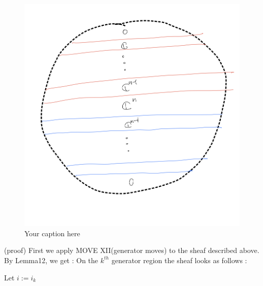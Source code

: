 \begin{figure}[H] %
    \centering
    \includegraphics[width=\linewidth]{diagrams/theorem15/4.png} %
    \caption{Your caption here}
    \label{fig:your-label}
\end{figure}
(proof) First we apply MOVE \RN{12}(generator moves) to the sheaf described above. By Lemma12, we get :
On the $k^{th}$ generator region the sheaf looks as follows :

Let $i := i_k$

